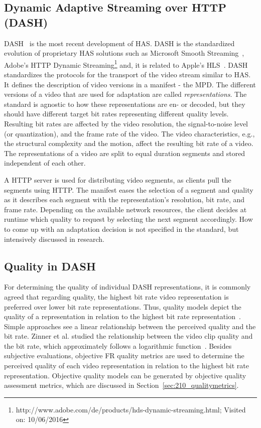\subsection{Dynamic Adaptive Streaming over HTTP (DASH)}
\ac{DASH}~\cite{Stockhammer2011} is the most recent development of \ac{HAS}.
\ac{DASH} is the standardized evolution of proprietary \ac{HAS} solutions such as Microsoft Smooth Streaming~\cite{SmoothStreaming2016}, Adobe's \ac{HTTP} Dynamic Streaming\footnote{http://www.adobe.com/de/products/hds-dynamic-streaming.html; Visited on: 10/06/2016} and, it is related to Apple's \ac{HLS}~\cite{hlsDraft}.
\ac{DASH} standardizes the protocols for the transport of the video stream similar to \ac{HAS}. 
It defines the description of video versions in a manifest - the \ac{MPD}.
The different versions of a video that are used for adaptation are called \emph{representations}.
The standard is agnostic to how these representations are en- or decoded, but they should have different target bit rates representing different quality levels. 
Resulting bit rates are affected by the video resolution, the signal-to-noise level (or quantization), and the frame rate of the video. 
The video characteristics, e.g., the structural complexity and the motion, affect the resulting bit rate of a video. 
The representations of a video are split to equal duration segments and stored independent of each other.

A \ac{HTTP} server is used for distributing video segments, as clients pull the segments using \ac{HTTP}. 
The manifest eases the selection of a segment and quality as it describes each segment with the representation's resolution, bit rate, and frame rate. 
Depending on the available network resources, the client decides at runtime which quality to request by selecting the next segment accordingly.
How to come up with an adaptation decision is not specified in the standard, but intensively discussed in research.
\subsection{Quality in \ac{DASH}}
\label{sec:250_adaptation_effects}
For determining the quality of individual \ac{DASH} representations, it is commonly agreed that regarding quality, the highest bit rate video representation is preferred over lower bit rate representations.
Thus, quality models depict the quality of a representation in relation to the highest bit rate representation~\cite{Hossfeld2014}.
Simple approaches see a linear relationship between the perceived quality and the bit rate.
Zinner et al. studied the relationship between the video clip quality and the bit rate, which approximately follows a logarithmic function~\cite{Zinner2010}. 
Besides subjective evaluations, objective \ac{FR} quality metrics are used to determine the perceived quality of each video representation in relation to the highest bit rate representation.
Objective quality models can be generated by objective quality assessment metrics, which are discussed in Section~\ref{sec:210_qualitymetrics}.

